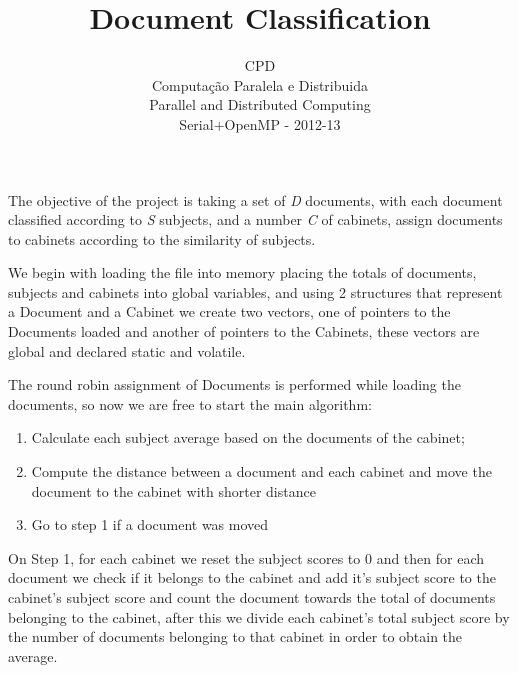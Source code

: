 \documentclass[times, 10pt,twocolumn]{article}
\begin{document}
\title{Document Classification}

\author{CPD\\
Computação Paralela e Distribuida\\
Parallel and Distributed Computing\\
Serial+OpenMP - 2012-13
}
	   
\maketitle
\thispagestyle{empty}


The objective of the project is taking a set of \emph{D} documents, with each document classified according to \emph{S} subjects, and a number \emph{C} of cabinets, assign documents to cabinets according to the similarity of subjects.


We begin with loading the file into memory placing the totals of documents, subjects and cabinets into global variables, and using 2 structures that represent a Document and a Cabinet we create two vectors, one of pointers to the Documents loaded and another of pointers to the Cabinets, these vectors are global and declared static and volatile.

The round robin assignment of Documents is performed while loading the documents, so now we are free to start the main algorithm:

\begin{enumerate}
\item Calculate each subject average based on the documents of the cabinet;
\item Compute the distance between a document and each cabinet and move the document to the cabinet with shorter distance
\item Go to step 1  if a document was moved
\end{enumerate}

On Step 1, for each cabinet we reset the subject scores to 0 and then for each document we check if it belongs to the cabinet and add it's subject score to the cabinet's subject score and count the document towards the total of documents belonging to the cabinet, after this we divide each cabinet's total subject score by the number of documents belonging to that cabinet in order to obtain the average.
\end{document}
